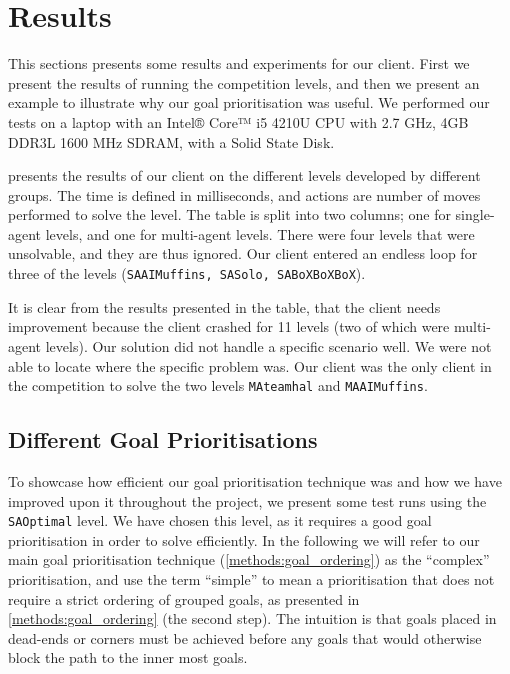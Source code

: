 \section{Results}
\label{sec:results}


This sections presents some results and experiments for our client.
First we present the results of running the competition levels, and then we present an example to illustrate why our goal prioritisation was useful.
We performed our tests on a laptop with an Intel® Core™ i5 4210U CPU with 2.7 GHz, 4GB DDR3L 1600 MHz SDRAM, with a Solid State Disk.

 presents the results of our client on the different levels developed by different groups.
The time is defined in milliseconds, and actions are number of moves performed to solve the level.
The table is split into two columns; one for single-agent levels, and one for multi-agent levels.
There were four levels that were unsolvable, and they are thus ignored.
Our client entered an endless loop for three of the levels (\texttt{SAAIMuffins, SASolo, SABoXBoXBoX}).

It is clear from the results presented in the table, that the client needs improvement because the client crashed for 11 levels (two of which were multi-agent levels).
Our solution did not handle a specific scenario well.
We were not able to locate where the specific problem was.
Our client was the only client in the competition to solve the two levels \texttt{MAteamhal} and \texttt{MAAIMuffins}.



\subsection{Different Goal Prioritisations}

To showcase how efficient our goal prioritisation technique was and how we have improved upon it throughout the project, we present some test runs using the \texttt{SAOptimal} level.
We have chosen this level, as it requires a good goal prioritisation in order to solve efficiently.
In the following we will refer to our main goal prioritisation technique (\cref{methods:goal_ordering}) as the ``complex'' prioritisation, and use the term ``simple'' to mean a prioritisation that does not require a strict ordering of grouped goals, as presented in \cref{methods:goal_ordering} (the second step).
The intuition is that goals placed in dead-ends or corners must be achieved before any goals that would otherwise block the path to the inner most goals.

